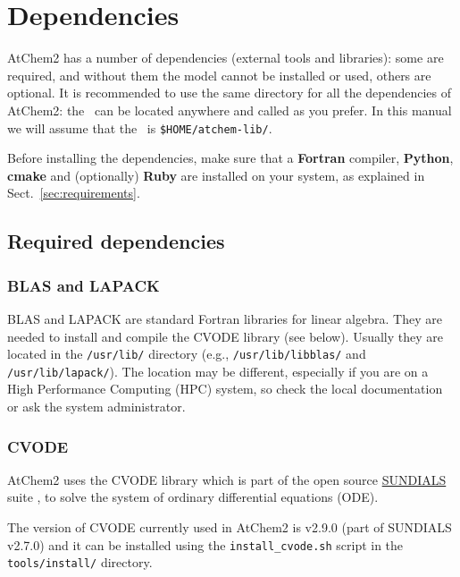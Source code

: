 \section{Dependencies} \label{sec:dependencies}

AtChem2 has a number of dependencies (external tools and libraries):
some are required, and without them the model cannot be installed or
used, others are optional. It is recommended to use the same directory
for all the dependencies of AtChem2: the \depdir\ can be located
anywhere and called as you prefer. In this manual we will assume that
the \depdir\ is \texttt{\$HOME/atchem-lib/}.

Before installing the dependencies, make sure that a \textbf{Fortran}
compiler, \textbf{Python}, \textbf{cmake} and (optionally)
\textbf{Ruby} are installed on your system, as explained in
Sect.~\ref{sec:requirements}.

\subsection{Required dependencies} \label{subsec:required-dependencies}

\subsubsection{BLAS and LAPACK}

BLAS and LAPACK are standard Fortran libraries for linear
algebra. They are needed to install and compile the CVODE library (see
below). Usually they are located in the \texttt{/usr/lib/} directory
(e.g., \texttt{/usr/lib/libblas/} and \texttt{/usr/lib/lapack/}). The
location may be different, especially if you are on a High Performance
Computing (HPC) system, so check the local documentation or ask the
system administrator.

\subsubsection{CVODE}

AtChem2 uses the CVODE library which is part of the open source
\href{https://computation.llnl.gov/projects/sundials}{SUNDIALS} suite
\citep{hindmarsh_2005}, to solve the system of ordinary
differential equations (ODE).

The version of CVODE currently used in AtChem2 is v2.9.0 (part of
SUNDIALS v2.7.0) and it can be installed using the
\texttt{install\_cvode.sh} script in the \texttt{tools/install/}
directory.


